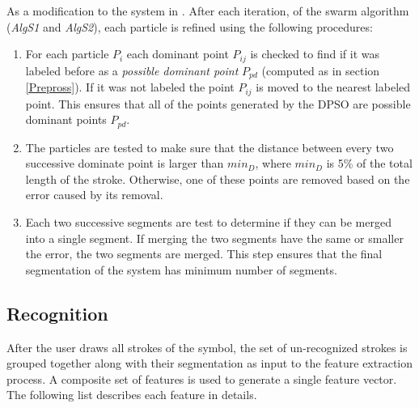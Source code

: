 \documentclass[preprint,1p,times,review]{elsarticle}
\begin{document}
 As a modification to the system in \cite{mypaper}. After each iteration, of the swarm algorithm (\textsl{AlgS1} and \textsl{AlgS2}), each particle is refined using the following procedures:
\begin{enumerate}
	\item For each particle $P_i$ each dominant point $P_{ij}$ is checked to find if it was labeled before as a \textit{possible dominant point} $P_{pd}$ (computed as in section \ref{Prepross}). If it was not labeled the point $P_{ij}$ is moved to the nearest labeled point. This ensures that all of the points generated by the DPSO are possible dominant points $P_{pd}$.
 \item The particles are tested to make sure that the distance between every two successive dominate point is larger than $min_D$, where $min_D$ is 5\% of the total length of the stroke.  Otherwise, one of these points are removed based on the error caused by its removal.
 \item Each two successive segments are test to determine if they can be merged into a single segment. If merging the two segments have the same or smaller the error, the two segments are merged. This step ensures that the final segmentation of the system has minimum number of segments.
\end{enumerate}

\subsection{Recognition}
\label{sec:Recognition} 

After the user draws all strokes of the symbol, the set of un-recognized strokes is grouped together along with their segmentation as input to the feature extraction process. A composite set of features is used to generate a single feature vector. The following list describes each feature in details.
\end{document}
